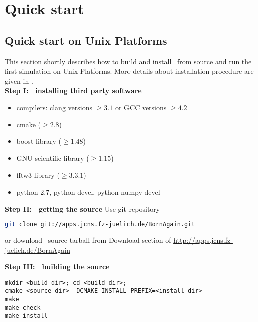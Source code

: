\newpage
\chapter{Quick start} 

\section{Quick start on Unix Platforms}

This section shortly describes how to build and install \BornAgain\ 
from source  and run the first simulation on Unix Platforms. 
More details about installation procedure are given in . \\

\noindent
{\bf Step I: $~$ installing third party software}
\begin{itemize}
\item compilers: clang  versions $\geq 3.1$ or GCC versions $\geq 4.2$
\item cmake ($\geq 2.8$)
\item boost library ($\geq 1.48$)
\item GNU scientific library ($\geq 1.15$)
\item fftw3 library ($\geq 3.3.1$)
\item python-2.7, python-devel, python-numpy-devel
\end{itemize}
\vspace*{2mm}


\noindent
{\bf Step II: $~$ getting the source} \newline
Use git repository
\begin{lstlisting}[language=bash, style=commandline]
git clone git://apps.jcns.fz-juelich.de/BornAgain.git 
\end{lstlisting}
or download \BornAgain\ source tarball from Download section of \url{http://apps.jcns.fz-juelich.de/BornAgain}

\vspace*{3mm}



\noindent
{\bf Step III: $~$ building the source}
\begin{lstlisting}[language=shell, style=commandline]
mkdir <build_dir>; cd <build_dir>;
cmake <source_dir> -DCMAKE_INSTALL_PREFIX=<install_dir>
make
make check
make install
\end{lstlisting}
\vspace*{3mm}


